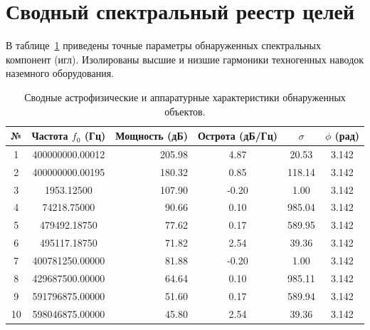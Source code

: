 \documentclass[11pt,twocolumn]{article}
\begin{document}
\section{Сводный спектральный реестр целей}
В таблице~\ref{tab:targets} приведены точные параметры обнаруженных спектральных компонент (игл). 
Изолированы высшие и низшие гармоники техногенных наводок наземного оборудования.\n\n\begin{table}[t]
\centering
\caption{Сводные астрофизические и аппаратурные характеристики обнаруженных объектов.}
\label{tab:targets}
\begin{tabular}{ccrccc}
\toprule
\textbf{№} & \textbf{Частота $f_0$ (Гц)} & \textbf{Мощность (дБ)} & \textbf{Острота (дБ/Гц)} & $\sigma$ & $\phi$ (рад) \\
\midrule
  1 & 400000000.00012 & 205.98 & 4.87 & 20.53 & 3.142 \\
  2 & 400000000.00195 & 180.32 & 0.85 & 118.14 & 3.142 \\
  3 & 1953.12500 & 107.90 & -0.20 & 1.00 & 3.142 \\
  4 & 74218.75000 & 90.66 & 0.10 & 985.04 & 3.142 \\
  5 & 479492.18750 & 77.62 & 0.17 & 589.95 & 3.142 \\
  6 & 495117.18750 & 71.82 & 2.54 & 39.36 & 3.142 \\
  7 & 400781250.00000 & 81.88 & -0.20 & 1.00 & 3.142 \\
  8 & 429687500.00000 & 64.64 & 0.10 & 985.11 & 3.142 \\
  9 & 591796875.00000 & 51.60 & 0.17 & 589.94 & 3.142 \\
  10 & 598046875.00000 & 45.80 & 2.54 & 39.36 & 3.142 \\
\bottomrule
\end{tabular}
\end{table}
\end{document}
